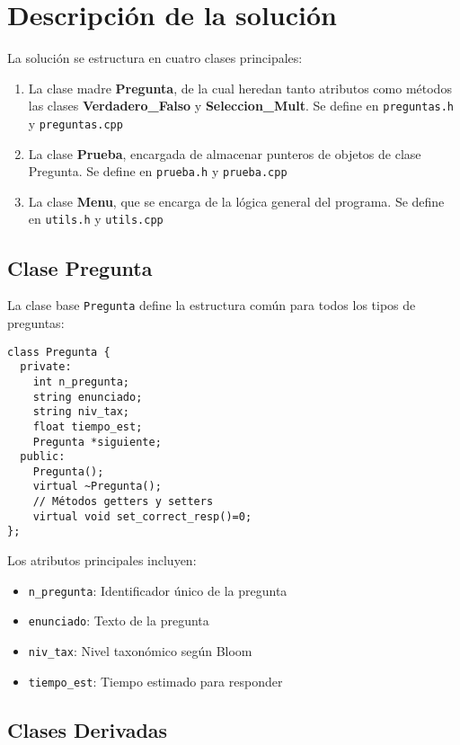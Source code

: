 \documentclass[12pt]{article}
\begin{document}
\section{Descripción de la solución}
La solución se estructura en cuatro clases principales:
\begin{enumerate}
    \item La clase madre \textbf{Pregunta}, de la cual heredan tanto atributos como métodos las clases \textbf{Verdadero\_Falso} y \textbf{Seleccion\_Mult}. Se define en \texttt{preguntas.h} y \texttt{preguntas.cpp}
    \item La clase \textbf{Prueba}, encargada de almacenar punteros de objetos de clase Pregunta. Se define en \texttt{prueba.h} y \texttt{prueba.cpp}
    \item La clase \textbf{Menu}, que se encarga de la lógica general del programa. Se define en \texttt{utils.h} y \texttt{utils.cpp}
\end{enumerate}

\subsection{Clase Pregunta}
La clase base \texttt{Pregunta} define la estructura común para todos los tipos de preguntas:

\begin{lstlisting}[style=customc]
class Pregunta {
  private:
    int n_pregunta;
    string enunciado;
    string niv_tax;
    float tiempo_est;
    Pregunta *siguiente;
  public:
    Pregunta();
    virtual ~Pregunta();
    // Métodos getters y setters
    virtual void set_correct_resp()=0;
};
\end{lstlisting}

Los atributos principales incluyen:
\begin{itemize}
    \item \texttt{n\_pregunta}: Identificador único de la pregunta
    \item \texttt{enunciado}: Texto de la pregunta
    \item \texttt{niv\_tax}: Nivel taxonómico según Bloom
    \item \texttt{tiempo\_est}: Tiempo estimado para responder
\end{itemize}

\subsection{Clases Derivadas}
\end{document}
